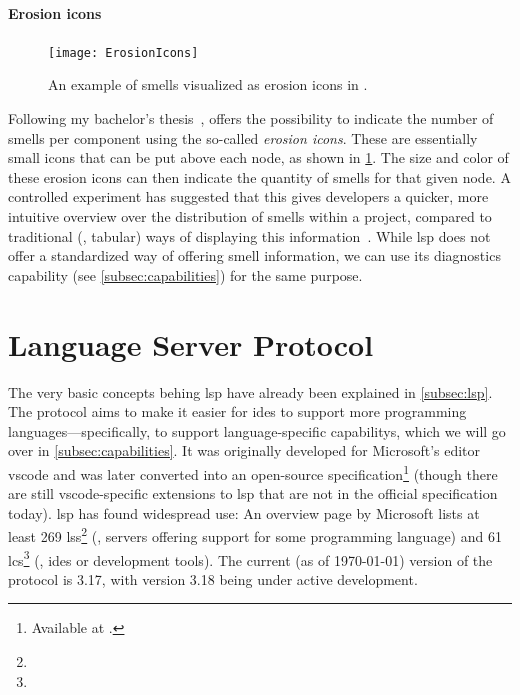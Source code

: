 \documentclass[../thesis]{subfiles}
\begin{document}
\paragraph{Erosion icons}

\begin{figure}[htbp]
	\begin{center}
		\texttt{[image: ErosionIcons]}
	\end{center}
	\caption{An example of \glspl{smell} visualized as erosion icons in \SEE{}.}\label{fig:erosion}
\end{figure}

Following my bachelor's thesis~\cite{galperin2021}, \SEE{} offers the possibility to indicate the number of \glspl{smell} per component using the so-called \emph{erosion icons}.
These are essentially small icons that can be put above each node, as shown in \cref{fig:erosion}.
The size and color of these erosion icons can then indicate the quantity of \glspl{smell} for that given node.
A controlled experiment has suggested that this gives developers a quicker, more intuitive overview over the distribution of \glspl{smell} within a project, compared to traditional (\ie, tabular) ways of displaying this information~\cite{galperin2022}.
While \gls{lsp} does not offer a standardized way of offering \gls{smell} information, we can use its diagnostics capability (see \cref{subsec:capabilities}) for the same purpose.

\section{Language Server Protocol}\label{sec:lsp}
The very basic concepts behing \gls{lsp} have already been explained in \cref{subsec:lsp}.
The protocol aims to make it easier for \glspl{ide} to support more programming languages---specifically, to support language-specific \glspl{capability}, which we will go over in \cref{subsec:capabilities}.
It was originally developed for Microsoft's editor \gls{vscode} and was later converted into an open-source specification\footnote{
	Available at .
} (though there are still \gls{vscode}-specific extensions to \gls{lsp} that are not in the official specification today).
\gls{lsp} has found widespread use:
An overview page by Microsoft lists at least 269 \glspl{ls}\footnote{} (\ie, servers offering support for some programming language) and 61 \glspl{lc}\footnote{} (\ie, \glspl{ide} or development tools).
The current (as of \today{}) version of the protocol is 3.17, with version 3.18 being under active development.
\end{document}
